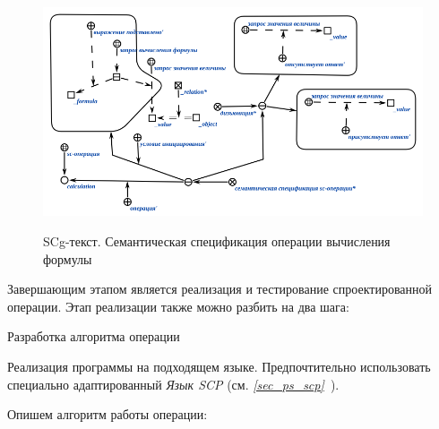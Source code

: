 \begin{figure}[H]
	\caption{SCg-текст. Семантическая спецификация операции вычисления формулы}
	\includegraphics[scale=0.8]{images/part7/chapter_learning_systems/formula-calculation-spec-kbe.png}
	\label{fig:formula-calculation-spec-kbe}
\end{figure}

Завершающим этапом является реализация и тестирование спроектированной операции. Этап реализации также можно разбить на два шага:

\begin{textitemize}
	\item Разработка алгоритма операции
	\item Реализация программы на подходящем языке. Предпочтительно использовать специально адаптированный \textit{Язык SCP} (см. \textit{\ref{sec_ps_scp}~}).
\end{textitemize}

Опишем алгоритм работы операции:

